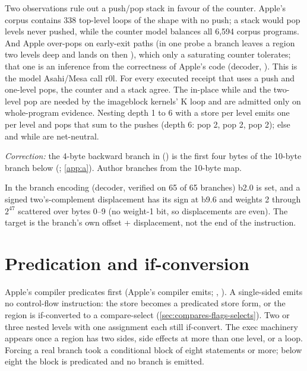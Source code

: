 Two observations rule out a push/pop stack in favour of the counter. Apple's corpus contains 338 top-level loops of the shape  with no push; a stack would pop levels never pushed, while the counter model balances all
6,594 corpus programs. And Apple over-pops on early-exit paths (in one probe a branch leaves a region two levels deep and
lands on  then ), which only a saturating counter tolerates; that one is an inference from the correctness of
Apple's code (decoder, ). This is the model Asahi/Mesa call r0l. For every executed receipt that uses
a push and one-level pops, the counter and a stack agree. The in-place while and the two-level pop are needed by the
imageblock kernels' K loop and are admitted only on whole-program evidence. Nesting depth 1 to 6 with a store per level
emits one  per level and pops that sum to the pushes (depth 6: pop 2, pop 2, pop 2); else and while are net-neutral.

\emph{Correction:} the 4-byte backward branch in  () is the first four bytes of the
10-byte branch below (; \cref{app:a}). Author branches from the 10-byte map.

In the branch encoding (decoder, verified on 65 of 65 branches) b2.0 is set, and a signed two's-complement displacement has its
sign at b9.6 and weights 2 through $2^{47}$ scattered over bytes 0–9 (no weight-1 bit, so displacements are even). The target is the
branch's own offset + displacement, not the end of the instruction.

\section{Predication and if-conversion}\label{sec:predication-if-conversion}

Apple's compiler predicates first (Apple's compiler emits; , ). A
single-sided  emits no control-flow instruction: the store becomes a predicated store form, or the region is
if-converted to a compare-select (\cref{sec:compares-flags-selects}). Two or three nested levels with one assignment each still if-convert.
The exec machinery appears once a region has two sides, side effects at more than one level, or a loop. Forcing a real
branch took a conditional block of eight statements or more; below eight the block is predicated and no branch is emitted.

